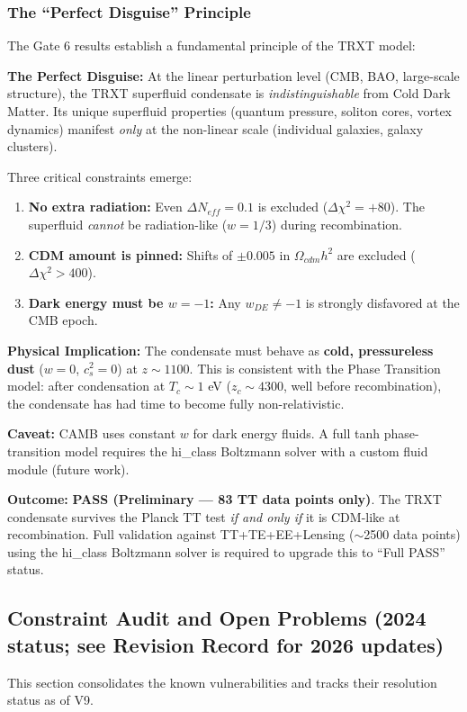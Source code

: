 \documentclass[a4paper,12pt]{article}
\begin{document}
\subsubsection{The ``Perfect Disguise'' Principle}

The Gate 6 results establish a fundamental principle of the TRXT model:

\begin{mdframed}[backgroundcolor=blue!5]
\textbf{The Perfect Disguise:} At the linear perturbation level (CMB, BAO, large-scale structure), the TRXT superfluid condensate is \textit{indistinguishable} from Cold Dark Matter. Its unique superfluid properties (quantum pressure, soliton cores, vortex dynamics) manifest \textit{only} at the non-linear scale (individual galaxies, galaxy clusters).
\end{mdframed}

Three critical constraints emerge:
\begin{enumerate}
    \item \textbf{No extra radiation:} Even $\Delta N_{eff} = 0.1$ is excluded ($\Delta\chi^2 = +80$). The superfluid \textit{cannot} be radiation-like ($w = 1/3$) during recombination.
    \item \textbf{CDM amount is pinned:} Shifts of $\pm 0.005$ in $\Omega_{cdm} h^2$ are excluded ($\Delta\chi^2 > 400$).
    \item \textbf{Dark energy must be $w = -1$:} Any $w_{DE} \neq -1$ is strongly disfavored at the CMB epoch.
\end{enumerate}

\textbf{Physical Implication:} The condensate must behave as \textbf{cold, pressureless dust} ($w = 0$, $c_s^2 = 0$) at $z \sim 1100$. This is consistent with the Phase Transition model: after condensation at $T_c \sim 1$ eV ($z_c \sim 4300$, well before recombination), the condensate has had time to become fully non-relativistic.

\textbf{Caveat:} CAMB uses constant $w$ for dark energy fluids. A full tanh phase-transition model requires the hi\_class Boltzmann solver with a custom fluid module (future work).

\textbf{Outcome:} \textbf{PASS (Preliminary --- 83 TT data points only)}. The TRXT condensate survives the Planck TT test \textit{if and only if} it is CDM-like at recombination. Full validation against TT+TE+EE+Lensing ($\sim$2500 data points) using the hi\_class Boltzmann solver is required to upgrade this to ``Full PASS'' status.

\subsection{Constraint Audit and Open Problems (2024 status; see Revision Record for 2026 updates)}
This section consolidates the known vulnerabilities and tracks their resolution status as of V9.
\end{document}
